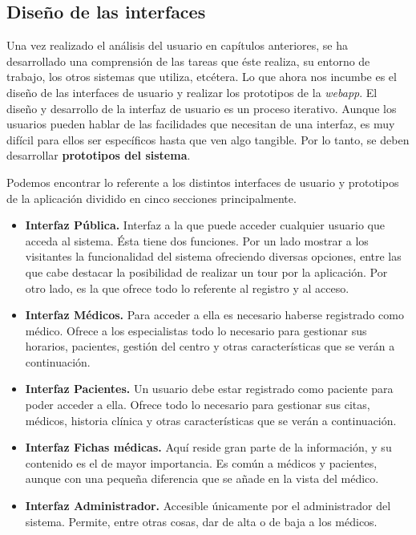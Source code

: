 	
	
	\subsection{Diseño de las interfaces} %
	\label{sec:iu_diseno}
	
	Una vez realizado el análisis del usuario en capítulos anteriores, se ha desarrollado una comprensión de las tareas que éste realiza, su entorno de trabajo, los otros sistemas que utiliza, etcétera. Lo que ahora nos incumbe es el diseño de las interfaces de usuario y realizar los prototipos de la \textit{webapp}. El diseño y desarrollo de la interfaz de usuario es un proceso iterativo. Aunque los usuarios pueden hablar de las facilidades que necesitan de una interfaz, es muy difícil para ellos ser específicos hasta que ven algo tangible. Por lo tanto, se deben desarrollar \textbf{prototipos del sistema}.
	
	Podemos encontrar lo referente a los distintos interfaces de usuario y prototipos de la aplicación dividido en cinco secciones principalmente.
	\begin{itemize}
	\item \textbf{Interfaz Pública.} Interfaz a la que puede acceder cualquier usuario que acceda al sistema. Ésta tiene dos funciones. Por un lado mostrar a los visitantes la funcionalidad del sistema ofreciendo diversas opciones, entre las que cabe destacar la posibilidad de realizar un tour por la aplicación. Por otro lado, es la que ofrece todo lo referente al registro y al acceso.
	\item \textbf{Interfaz Médicos.} Para acceder a ella es necesario haberse registrado como médico. Ofrece a los especialistas todo lo necesario para gestionar sus horarios, pacientes, gestión del centro y otras características que se verán a continuación.
	\item \textbf{Interfaz Pacientes.} Un usuario debe estar registrado como paciente para poder acceder a ella. Ofrece todo lo necesario para gestionar sus citas, médicos, historia clínica y otras características que se verán a continuación.
	\item \textbf{Interfaz Fichas médicas.} Aquí reside gran parte de la información, y su contenido es el de mayor importancia. Es común a médicos y pacientes, aunque con una pequeña diferencia que se añade en la vista del médico.
	\item \textbf{Interfaz Administrador.} Accesible únicamente por el administrador del sistema. Permite, entre otras cosas, dar de alta o de baja a los médicos.
	\end{itemize}
	
